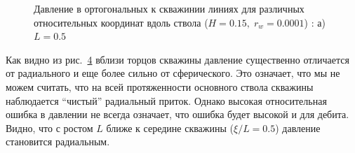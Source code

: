 \documentclass{article}
\begin{document}
\begin{figure}[h!]
\centering
\begin{subfigure}{0.3\textwidth}

\caption{}
\label{eq:kham_py_L05_rw0001_H015_mgrp}
\end{subfigure}
\hfill
\begin{subfigure}{0.3\textwidth}

\caption{}
\label{eq:kham_py_L2_rw0001_H015_mgrp}
\end{subfigure}
\hfill
\begin{subfigure}{0.3\textwidth}

\caption{}
\label{eq:kham_py_L10_rw0001_H015_mgrp}
\end{subfigure}

\caption{Давление в ортогональных к скважинии линиях для различных относительных координат вдоль ствола ($H=0.15, \; r_w = 0.0001$) : а) $L=0.5$}
\label{fig:kham_rad_hypo_fault_p_over_l}
\end{figure}

Как видно из рис.~\ref{fig:kham_rad_hypo_fault_p_over_l} вблизи торцов скважины давление существенно отличается от радиального и еще более сильно от сферического.
Это означает, что мы не можем считать, что на всей протяженности основного ствола скважины наблюдается ``чистый'' радиальный приток.
Однако высокая относительная ошибка в давлении не всегда означает, что ошибка будет высокой и для дебита.
Видно, что с ростом $L$ ближе к середине скважины ($\xi / L = 0.5$) давление становится радиальным.
\end{document}
